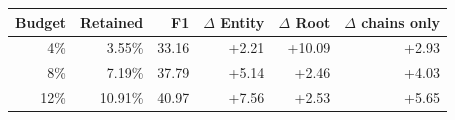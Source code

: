 \begin{tabular}{rrrrrr}
\toprule
Budget & Retained & F1 & $\Delta$ Entity & $\Delta$ Root & $\Delta$ chains only \\
\midrule
4\% & 3.55\% & 33.16 & +2.21 & +10.09 & +2.93 \\
8\% & 7.19\% & 37.79 & +5.14 & +2.46 & +4.03 \\
12\% & 10.91\% & 40.97 & +7.56 & +2.53 & +5.65 \\
\bottomrule
\end{tabular}
